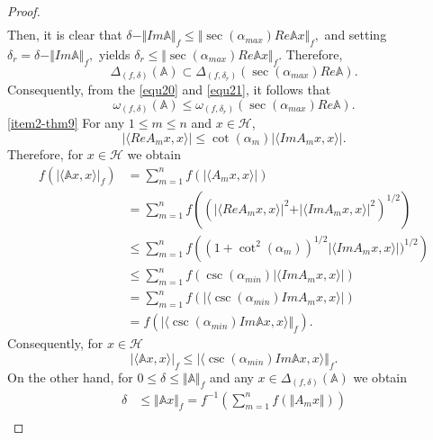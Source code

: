 \documentclass[10pt,a4paper]{amsart}
\begin{document}
\begin{proof}
\begin{align*}
\end{align*}
Then, it is clear that
\(
\delta - \Vert Im \mathbb{A} \Vert_{f} \leq  \Vert \sec(\alpha_{max})Re\mathbb{A}x \Vert_{f},
\)
and setting $\delta_{r}=\delta - \Vert Im \mathbb{A} \Vert_{f},   $
yields
\(
\delta_{r} \leq  \Vert \sec(\alpha_{max})Re\mathbb{A}x \Vert_{f}.
\)
Therefore,
\begin{equation}
\label{equ21}
\Delta_{(f,\delta)}(\mathbb{A})\subset\Delta_{(f,\delta_{r})}\left( \sec(\alpha_{max})Re\mathbb{A} \right) .
\end{equation}
Consequently, from the \eqref{equ20} and \eqref{equ21}, it follows that
\[
\omega_{(f,\delta)}(\mathbb{A})\leq \omega_{(f,\delta_{r})}(\sec(\alpha_{max})Re\mathbb{A}).
\]
\noindent \ref{item2-thm9} For any $ 1\leq m\leq n $ and $ x\in \mathcal{H} $,
\[
\vert \langle Re A_{m}x,x\rangle \vert \leq \cot(\alpha_{m}) \vert \langle Im A_{m}x,x\rangle \vert .
\]
Therefore, for $ x\in \mathcal{H} $ we obtain
\begin{align*}
f\left(  \vert \langle \mathbb{A}x,x \rangle \vert_{f}\right) &= \sum\limits_{m=1}^{n} f\left(  \vert \langle A_{m}x,x \rangle \vert\right) \\
&= \sum\limits_{m=1}^{n} f\left( \left( \vert \langle ReA_{m}x,x\rangle \vert^{2} + \vert \langle ImA_{m}x,x\rangle \vert^{2}\right) ^{1/2} \right) \\
&\leq \sum\limits_{m=1}^{n} f \left( \left( 1+\cot^{2}(\alpha_{m}) \right)^{1/2} \vert \langle ImA_{m}x,x\rangle \vert )^{1/2}\right) \\
&\leq \sum\limits_{m=1}^{n} f \left( \csc(\alpha_{min})\vert \langle ImA_{m}x,x\rangle \vert \right) \\
&= \sum\limits_{m=1}^{n} f \left( \vert \langle \csc(\alpha_{min})ImA_{m}x,x\rangle \vert \right) \\
&= f \left( \vert \langle \csc(\alpha_{min})Im\mathbb{A}x,x\rangle \Vert_{f}\right) .
\end{align*}
Consequently, for $ x\in \mathcal{H} $
\begin{equation}
\label{equ22}
\vert \langle \mathbb{A} x,x \rangle \vert_{f}\leq \vert \langle \csc(\alpha_{min})Im\mathbb{A}x,x\rangle \Vert_{f} .
\end{equation}
On the other hand, for $ 0\leq\delta\leq \Vert  \mathbb{A} \Vert_{f} $ and any $ x\in \Delta_{(f,\delta)}( \mathbb{A}) $ we obtain
\begin{align*}
\delta &\leq \Vert \mathbb{A} x \Vert_{f} = f^{-1}\left( \sum\limits_{m=1}^{n}f\left( \Vert A_{m}x \Vert \right)  \right) \\

\end{align*}
\end{proof}
\end{document}
